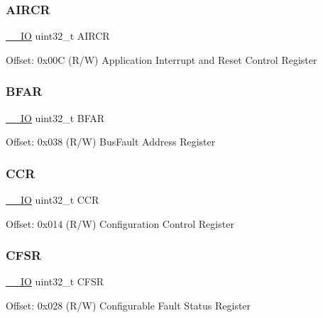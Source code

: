 \subsubsection{\texorpdfstring{AIRCR}{AIRCR}}
{\footnotesize\ttfamily \mbox{\hyperlink{core__sc300_8h_aec43007d9998a0a0e01faede4133d6be}{\+\_\+\+\_\+\+IO}} uint32\+\_\+t A\+I\+R\+CR}

Offset\+: 0x00C (R/W) Application Interrupt and Reset Control Register \mbox{\label{struct_s_c_b___type_ad49f99b1c83dcab356579af171bfa475}} 
\subsubsection{\texorpdfstring{BFAR}{BFAR}}
{\footnotesize\ttfamily \mbox{\hyperlink{core__sc300_8h_aec43007d9998a0a0e01faede4133d6be}{\+\_\+\+\_\+\+IO}} uint32\+\_\+t B\+F\+AR}

Offset\+: 0x038 (R/W) Bus\+Fault Address Register \mbox{\label{struct_s_c_b___type_a5e1322e27c40bf91d172f9673f205c97}} 
\subsubsection{\texorpdfstring{CCR}{CCR}}
{\footnotesize\ttfamily \mbox{\hyperlink{core__sc300_8h_aec43007d9998a0a0e01faede4133d6be}{\+\_\+\+\_\+\+IO}} uint32\+\_\+t C\+CR}

Offset\+: 0x014 (R/W) Configuration Control Register \mbox{\label{struct_s_c_b___type_ae6b1e9cde3f94195206c016214cf3936}} 
\subsubsection{\texorpdfstring{CFSR}{CFSR}}
{\footnotesize\ttfamily \mbox{\hyperlink{core__sc300_8h_aec43007d9998a0a0e01faede4133d6be}{\+\_\+\+\_\+\+IO}} uint32\+\_\+t C\+F\+SR}

Offset\+: 0x028 (R/W) Configurable Fault Status Register \mbox{\label{struct_s_c_b___type_acccaf5688449c8253e9952ddc2161528}} 

